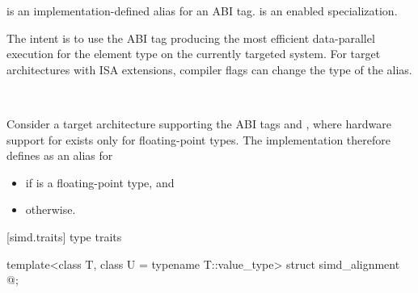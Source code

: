 

\pnum
{} is an implementation-defined alias for an ABI tag.
 is an enabled specialization.
\begin{note}
The intent is to use the ABI tag producing the most efficient data-parallel
execution for the element type  on the currently
targeted system.
For target architectures with ISA extensions, compiler flags can change the
type of the  alias.
\end{note}\\
\begin{example}
  Consider a target architecture supporting the ABI tags
   and , where hardware support for
   exists only for floating-point types.
  The implementation therefore defines  as an alias for
  \begin{itemize}
    \item {} if  is a floating-point type, and
    \item {} otherwise.
  \end{itemize}
\end{example}

[simd.traits]{ type traits}

\begin{itemdecl}
template<class T, class U = typename T::value_type> struct simd_alignment { @\seebelow@ };
\end{itemdecl}

